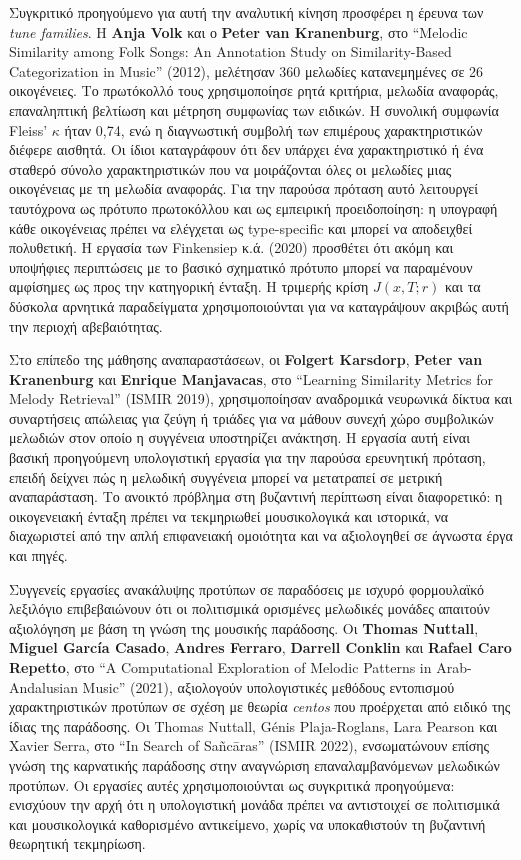 \documentclass[11pt,a4paper]{article}
\begin{document}
Συγκριτικό προηγούμενο για αυτή την αναλυτική κίνηση προσφέρει η έρευνα των \emph{tune families}. Η \textbf{Anja Volk} και ο \textbf{Peter van Kranenburg}, στο ``Melodic Similarity among Folk Songs: An Annotation Study on Similarity-Based Categorization in Music'' (2012), μελέτησαν 360 μελωδίες κατανεμημένες σε 26 οικογένειες. Το πρωτόκολλό τους χρησιμοποίησε ρητά κριτήρια, μελωδία αναφοράς, επαναληπτική βελτίωση και μέτρηση συμφωνίας των ειδικών. Η συνολική συμφωνία Fleiss' $\kappa$ ήταν 0,74, ενώ η διαγνωστική συμβολή των επιμέρους χαρακτηριστικών διέφερε αισθητά. Οι ίδιοι καταγράφουν ότι δεν υπάρχει ένα χαρακτηριστικό ή ένα σταθερό σύνολο χαρακτηριστικών που να μοιράζονται όλες οι μελωδίες μιας οικογένειας με τη μελωδία αναφοράς. Για την παρούσα πρόταση αυτό λειτουργεί ταυτόχρονα ως πρότυπο πρωτοκόλλου και ως εμπειρική προειδοποίηση: η υπογραφή κάθε οικογένειας πρέπει να ελέγχεται ως type-specific και μπορεί να αποδειχθεί πολυθετική. Η εργασία των Finkensiep κ.ά. (2020) προσθέτει ότι ακόμη και υποψήφιες περιπτώσεις με το βασικό σχηματικό πρότυπο μπορεί να παραμένουν αμφίσημες ως προς την κατηγορική ένταξη. Η τριμερής κρίση $J(x,T;r)$ και τα δύσκολα αρνητικά παραδείγματα χρησιμοποιούνται για να καταγράψουν ακριβώς αυτή την περιοχή αβεβαιότητας.

Στο επίπεδο της μάθησης αναπαραστάσεων, οι \textbf{Folgert Karsdorp}, \textbf{Peter van Kranenburg} και \textbf{Enrique Manjavacas}, στο ``Learning Similarity Metrics for Melody Retrieval'' (ISMIR 2019), χρησιμοποίησαν αναδρομικά νευρωνικά δίκτυα και συναρτήσεις απώλειας για ζεύγη ή τριάδες για να μάθουν συνεχή χώρο συμβολικών μελωδιών στον οποίο η συγγένεια υποστηρίζει ανάκτηση. Η εργασία αυτή είναι βασική προηγούμενη υπολογιστική εργασία για την παρούσα ερευνητική πρόταση, επειδή δείχνει πώς η μελωδική συγγένεια μπορεί να μετατραπεί σε μετρική αναπαράσταση. Το ανοικτό πρόβλημα στη βυζαντινή περίπτωση είναι διαφορετικό: η οικογενειακή ένταξη πρέπει να τεκμηριωθεί μουσικολογικά και ιστορικά, να διαχωριστεί από την απλή επιφανειακή ομοιότητα και να αξιολογηθεί σε άγνωστα έργα και πηγές.

Συγγενείς εργασίες ανακάλυψης προτύπων σε παραδόσεις με ισχυρό φορμουλαϊκό λεξιλόγιο επιβεβαιώνουν ότι οι πολιτισμικά ορισμένες μελωδικές μονάδες απαιτούν αξιολόγηση με βάση τη γνώση της μουσικής παράδοσης. Οι \textbf{Thomas Nuttall}, \textbf{Miguel García Casado}, \textbf{Andres Ferraro}, \textbf{Darrell Conklin} και \textbf{Rafael Caro Repetto}, στο ``A Computational Exploration of Melodic Patterns in Arab-Andalusian Music'' (2021), αξιολογούν υπολογιστικές μεθόδους εντοπισμού χαρακτηριστικών προτύπων σε σχέση με θεωρία \emph{centos} που προέρχεται από ειδικό της ίδιας της παράδοσης. Οι Thomas Nuttall, Génis Plaja-Roglans, Lara Pearson και Xavier Serra, στο ``In Search of Sañcāras'' (ISMIR 2022), ενσωματώνουν επίσης γνώση της καρνατικής παράδοσης στην αναγνώριση επαναλαμβανόμενων μελωδικών προτύπων. Οι εργασίες αυτές χρησιμοποιούνται ως συγκριτικά προηγούμενα: ενισχύουν την αρχή ότι η υπολογιστική μονάδα πρέπει να αντιστοιχεί σε πολιτισμικά και μουσικολογικά καθορισμένο αντικείμενο, χωρίς να υποκαθιστούν τη βυζαντινή θεωρητική τεκμηρίωση.
\end{document}
